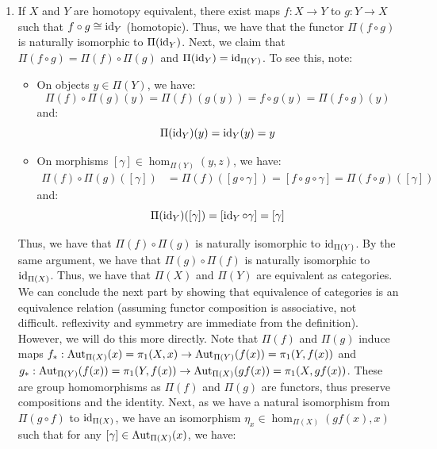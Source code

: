 \documentclass[12pt]{article}
\begin{document}
\begin{solution}
\begin{enumerate}
\begin{itemize}
    \end{itemize}
    Thus, $H'$ is a path-homotopy. Therefore, we have:
    \[ [f_*([\gamma]) \cdot \eta_z \cdot \id_{g(z)}] = [\id_{f(y)} \cdot \eta_y \cdot g_*([\gamma])]\]
    Since the constant paths $\id_{-}$ are the identity morphisms for their respective objects, we conclude:
    \[ [f_*([\gamma]) \cdot \eta_z] = [\eta_y \cdot g_*([\gamma])]\]
    Thus, we conclude that $\Pi(f)$ and $\Pi(g)$ are naturally isomorphic.
    \item If $X$ and $Y$ are homotopy equivalent, there exist maps $f: X \to Y$ to $g: Y \to X$ such that $f \circ g \cong \operatorname{id}_Y$ (homotopic). Thus, we have that the functor $\Pi(f\circ g)$ is naturally isomorphic to $\Pi(\operatorname{id}_Y)$. Next, we claim that $\Pi(f \circ g) = \Pi(f) \circ \Pi(g)$ and $\Pi(\operatorname{id}_Y) = \operatorname{id}_{\Pi(Y)}$. To see this, note:
    \begin{itemize}
        \item On objects $y \in \Pi(Y)$, we have: 
        \[ \Pi(f)\circ \Pi(g)(y) = \Pi(f)(g(y)) = f\circ g(y) = \Pi(f \circ g)(y) \]
        and: 
        \[ \Pi(\operatorname{id}_Y)(y) = \operatorname{id}_Y(y) = y\]
        \item On morphisms $[\gamma] \in \hom_{\Pi(Y)}(y,z)$, we have:
        \begin{align*}
            \Pi(f) \circ \Pi(g)([\gamma]) &= \Pi(f)([g \circ \gamma]) = [f \circ g \circ \gamma] = \Pi(f \circ g)([\gamma])
        \end{align*}
        and: 
        \[ \Pi(\operatorname{id}_Y)([\gamma]) = [\operatorname{id}_Y \circ \gamma] = [\gamma]\]
    \end{itemize}
    Thus, we have that $\Pi(f) \circ \Pi(g)$ is naturally isomorphic to $\operatorname{id}_{\Pi(Y)}$. By the same argument, we have that $\Pi(g) \circ \Pi(f)$ is naturally isomorphic to $\operatorname{id}_{\Pi(X)}$. Thus, we have that $\Pi(X)$ and $\Pi(Y)$ are equivalent as categories. \bbni
    We can conclude the next part by showing that equivalence of categories is an equivalence relation (assuming functor composition is associative, not difficult. reflexivity and symmetry are immediate from the definition). However, we will do this more directly. \bbni
    Note that $\Pi(f)$ and $\Pi(g)$ induce maps $f_*: \operatorname{Aut}_{\Pi(X)}(x) = \pi_1(X, x) \to \operatorname{Aut}_{\Pi(Y)}(f(x)) = \pi_1(Y, f(x))$ and $g_*: \operatorname{Aut}_{\Pi(Y)}(f(x)) = \pi_1(Y, f(x)) \to \operatorname{Aut}_{\Pi(X)}(gf(x)) = \pi_1(X, gf(x))$. These are group homomorphisms as $\Pi(f)$ and $\Pi(g)$ are functors, thus preserve compositions and the identity. \bbni 
    Next, as we have a natural isomorphism from $\Pi(g\circ f)$ to $\operatorname{id}_{\Pi(X)}$, we have an isomorphism $\eta_x \in \hom_{\Pi(X)}(gf(x), x)$ such that for any $[\gamma] \in \operatorname{Aut}_{\Pi(X)}(x)$, we have:

\end{enumerate}
\end{solution}
\end{document}
